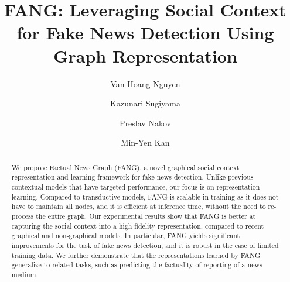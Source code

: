 \documentclass[sigconf]{acmart}
\theoremstyle{definition}
\theoremstyle{hypothesis}
\begin{document}
\title{FANG: Leveraging Social Context for Fake News Detection Using Graph Representation}


\author{Van-Hoang Nguyen}

\author{Kazunari Sugiyama}

\author{Preslav Nakov}

\author{Min-Yen Kan}

\renewcommand{\shortauthors}{Nguyen, Sugiyama, Nakov, and Kan}

\begin{abstract}
We propose Factual News Graph (FANG), a novel graphical social context representation and learning framework for fake news detection. 
Unlike previous contextual models that have targeted performance, our focus is on representation learning.  
Compared to transductive models, FANG is scalable in training as it does not have to maintain all nodes, and it is efficient at inference time, without the need to re-process the entire graph.
Our experimental results show that FANG is better at capturing the social context into a high fidelity representation, compared to recent graphical and non-graphical models. In particular, FANG yields significant improvements for the task of fake news detection, and it is robust in the case of limited training data. We further demonstrate that the representations learned by FANG generalize to related tasks, such as predicting the factuality of reporting of a news medium. 
\end{abstract}
\end{document}
